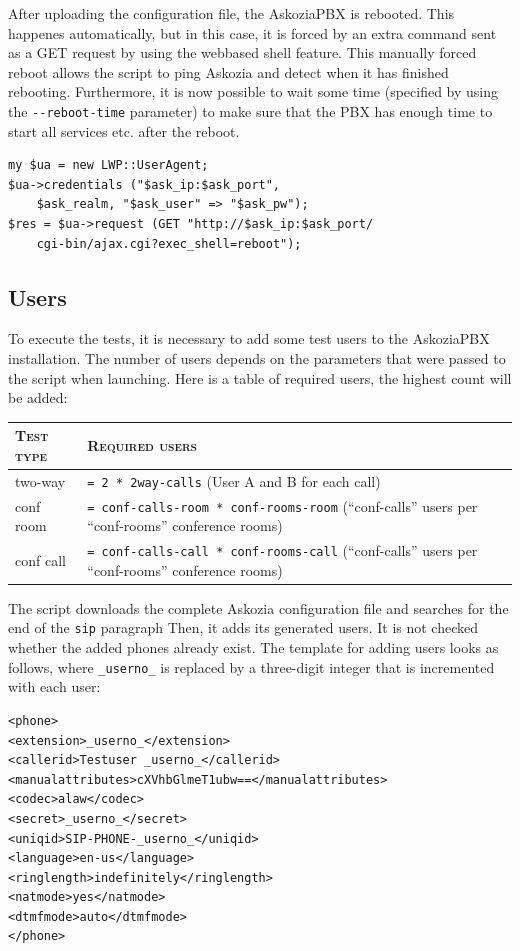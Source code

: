 After uploading the configuration file, the AskoziaPBX is rebooted.
This happenes automatically, but in this case, it is forced by an extra command sent as a GET request by using the webbased shell feature.
This manually forced reboot allows the script to ping Askozia and detect when it has finished rebooting.
Furthermore, it is now possible to wait some time (specified by using the \texttt{-{}-reboot-time} parameter)
to make sure that the PBX has enough time to start all services etc. after the reboot.
\begin{lstlisting}[breaklines=true,label=code:config-reboot,caption={Executing Askozia reboot} ]
my $ua = new LWP::UserAgent;
$ua->credentials ("$ask_ip:$ask_port",
    $ask_realm,	"$ask_user" => "$ask_pw");
$res = $ua->request (GET "http://$ask_ip:$ask_port/
    cgi-bin/ajax.cgi?exec_shell=reboot");
\end{lstlisting}


\subsection{Users}%
To execute the tests, it is necessary to add some test users to the AskoziaPBX installation.
The number of users depends on the parameters that were passed to the script when launching.
Here is a table of required users, the highest count will be added:

\begin{tabular}{|p{2cm}|p{12cm}|} \hline
	\textsc{Test type} & \textsc{Required users} \\ \hline \hline
	two-way & \texttt{= 2 * 2way-calls} (User A and B for each call) \\
	conf room & \texttt{= conf-calls-room * conf-rooms-room} \newline (``conf-calls'' users per ``conf-rooms'' conference rooms) \\
	conf call & \texttt{= conf-calls-call * conf-rooms-call} \newline (``conf-calls'' users per ``conf-rooms'' conference rooms) \\
	\hline
\end{tabular}

The script downloads the complete Askozia configuration file and searches for the end of the \texttt{sip} paragraph
Then, it adds its generated users. It is not checked whether the added phones already exist.
The template for adding users looks as follows, where \texttt{\_userno\_} is replaced by a three-digit integer that is incremented with each user:
\begin{lstlisting}[breaklines=true,label=code:config-user-template,caption={User template} ]
<phone>
<extension>_userno_</extension>
<callerid>Testuser _userno_</callerid>
<manualattributes>cXVhbGlmeT1ubw==</manualattributes>
<codec>alaw</codec>
<secret>_userno_</secret>
<uniqid>SIP-PHONE-_userno_</uniqid>
<language>en-us</language>
<ringlength>indefinitely</ringlength>
<natmode>yes</natmode>
<dtmfmode>auto</dtmfmode>
</phone>
\end{lstlisting}

